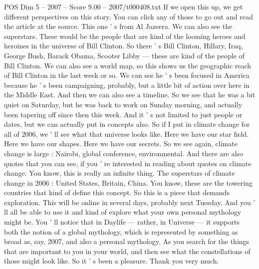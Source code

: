 \begin{textsample}{POS Dim 5 – 2007 – Score 9.00 – 2007/t000408.txt}
If we open this up, we get different perspectives on this story.
You can click any of those to go out and read the article at the source.
This one ' s from Al Jazeera.
We can also see the superstars.
These would be the people that are kind of the looming heroes and heroines in the universe of Bill Clinton.
So there ' s Bill Clinton, Hillary, Iraq, George Bush, Barack Obama, Scooter Libby — these are kind of the people of Bill Clinton.
We can also see a world map, so this shows us the geographic reach of Bill Clinton in the last week or so.
We can see he ' s been focused in America because he ' s been campaigning, probably, but a little bit of action over here in the Middle East.
And then we can also see a timeline.
So we see that he was a bit quiet on Saturday, but he was back to work on Sunday morning, and actually been tapering off since then this week.
And it ' s not limited to just people or dates, but we can actually put in concepts also.
So if I put in climate change for all of 2006, we ' ll see what that universe looks like.
Here we have our star field.
Here we have our shapes.
Here we have our secrets.
So we see again, climate change is large : Nairobi, global conference, environmental.
And there are also quotes that you can see, if you ' re interested in reading about quotes on climate change.
You know, this is really an infinite thing.
The superstars of climate change in 2006 : United States, Britain, China.
You know, these are the towering countries that kind of define this concept.
So this is a piece that demands exploration.
This will be online in several days, probably next Tuesday.
And you ' ll all be able to use it and kind of explore what your own personal mythology might be.
You ' ll notice that in Daylife — rather, in Universe — it supports both the notion of a global mythology, which is represented by something as broad as, say, 2007, and also a personal mythology.
As you search for the things that are important to you in your world, and then see what the constellations of those might look like.
So it ' s been a pleasure.
Thank you very much.

\end{textsample}
